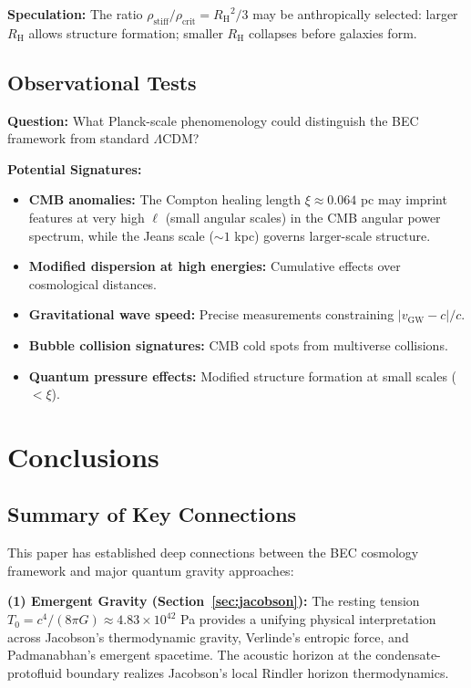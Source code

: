 \documentclass[11pt,a4paper]{article}
\newcommand{\rhocrit}{\ensuremath{\rho_{\mathrm{crit}}}}
\newcommand{\rhostiff}{\ensuremath{\rho_{\mathrm{stiff}}}}
\newcommand{\Tzero}{\ensuremath{T_0}}
\newcommand{\RH}{\ensuremath{R_{\mathrm{H}}}}
\theoremstyle{definition}
\theoremstyle{remark}
\begin{document}
\textbf{Speculation:} The ratio $\rhostiff/\rhocrit = \RH^2/3$ may be anthropically selected: larger $\RH$ allows structure formation; smaller $\RH$ collapses before galaxies form.

\subsection{Observational Tests}
\label{sec:obs_tests}

\textbf{Question:} What Planck-scale phenomenology could distinguish the BEC framework from standard $\Lambda$CDM?

\textbf{Potential Signatures:}
\begin{itemize}
\item \textbf{CMB anomalies:} The Compton healing length $\xi \approx 0.064$ pc may imprint features at very high $\ell$ (small angular scales) in the CMB angular power spectrum, while the Jeans scale ($\sim 1$ kpc) governs larger-scale structure.
\item \textbf{Modified dispersion at high energies:} Cumulative effects over cosmological distances.
\item \textbf{Gravitational wave speed:} Precise measurements constraining $|v_{\mathrm{GW}} - c|/c$.
\item \textbf{Bubble collision signatures:} CMB cold spots from multiverse collisions.
\item \textbf{Quantum pressure effects:} Modified structure formation at small scales ($< \xi$).
\end{itemize}

\section{Conclusions}
\label{sec:conclusions}

\subsection{Summary of Key Connections}
\label{sec:summary_connections}

This paper has established deep connections between the BEC cosmology framework and major quantum gravity approaches:

\textbf{(1) Emergent Gravity (Section~\ref{sec:jacobson}):} The resting tension $\Tzero = c^4/(8\pi G) \approx 4.83 \times 10^{42}$ Pa provides a unifying physical interpretation across Jacobson's thermodynamic gravity, Verlinde's entropic force, and Padmanabhan's emergent spacetime. The acoustic horizon at the condensate-protofluid boundary realizes Jacobson's local Rindler horizon thermodynamics.
\end{document}
